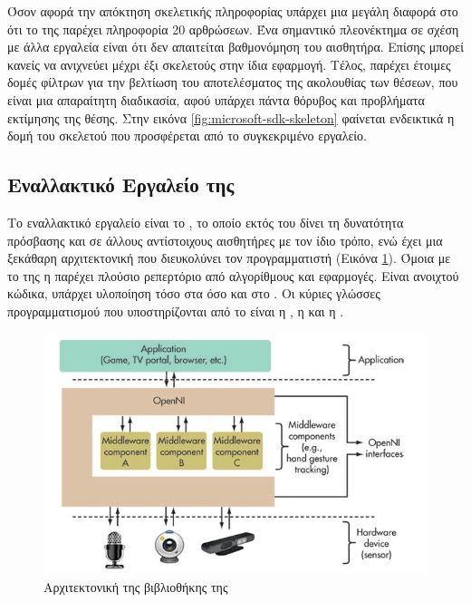 Όσον αφορά την απόκτηση σκελετικής πληροφορίας υπάρχει μια μεγάλη διαφορά στο ότι το  της  παρέχει πληροφορία 20 αρθρώσεων. Ένα σημαντικό πλεονέκτημα σε σχέση με άλλα εργαλεία είναι ότι δεν απαιτείται βαθμονόμηση του αισθητήρα. Επίσης μπορεί κανείς να ανιχνεύει μέχρι έξι σκελετούς στην ίδια εφαρμογή. Τέλος, παρέχει έτοιμες δομές φίλτρων για την βελτίωση του αποτελέσματος της ακολουθίας των θέσεων, που είναι μια απαραίτητη διαδικασία, αφού υπάρχει πάντα θόρυβος και προβλήματα εκτίμησης της θέσης. Στην εικόνα \ref{fig:microsoft-sdk-skeleton} φαίνεται ενδεικτικά η δομή του σκελετού που προσφέρεται από το συγκεκριμένο εργαλείο.

\subsection{\texorpdfstring{Εναλλακτικό Εργαλείο της }{}}

Το εναλλακτικό εργαλείο είναι το , το οποίο εκτός του  δίνει τη δυνατότητα πρόσβασης και σε άλλους αντίστοιχους αισθητήρες με τον ίδιο τρόπο, ενώ έχει μια ξεκάθαρη αρχιτεκτονική που διευκολύνει τον προγραμματιστή (Εικόνα \ref{fig:openni-framework}). Όμοια με το  της  η  παρέχει πλούσιο ρεπερτόριο από αλγορίθμους και εφαρμογές. Είναι ανοιχτού κώδικα, υπάρχει υλοποίηση τόσο στα  όσο και στο  . Οι κύριες γλώσσες προγραμματισμού  που υποστηρίζονται από το  είναι η , η  και η .

\begin{figure}[H]
    \centering
    \includegraphics[width=.7\textwidth, height=.3\textheight, keepaspectratio]{fig/openni-framework.jpg}
    \caption{Αρχιτεκτονική της βιβλιοθήκης της \protect\footnotemark}
    \label{fig:openni-framework}
\end{figure}

